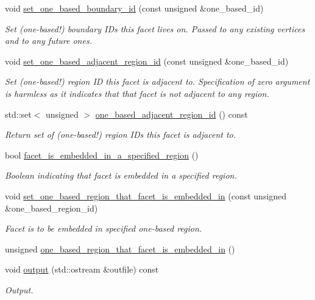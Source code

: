 \begin{DoxyCompactItemize}
void \hyperlink{classoomph_1_1TetMeshFacet_a578058c44b79c484e14be087f4f0a77f}{set\+\_\+one\+\_\+based\+\_\+boundary\+\_\+id} (const unsigned \&one\+\_\+based\+\_\+id)
\begin{DoxyCompactList}\small\item\em Set (one-\/based!) boundary I\+Ds this facet lives on. Passed to any existing vertices and to any future ones. \end{DoxyCompactList}\item 
void \hyperlink{classoomph_1_1TetMeshFacet_ac9be074ef764a6b59cbef9840fe7f38b}{set\+\_\+one\+\_\+based\+\_\+adjacent\+\_\+region\+\_\+id} (const unsigned \&one\+\_\+based\+\_\+id)
\begin{DoxyCompactList}\small\item\em Set (one-\/based!) region ID this facet is adjacent to. Specification of zero argument is harmless as it indicates that that facet is not adjacent to any region. \end{DoxyCompactList}\item 
std\+::set$<$ unsigned $>$ \hyperlink{classoomph_1_1TetMeshFacet_acd88930abc1356702d60841b0e8224e9}{one\+\_\+based\+\_\+adjacent\+\_\+region\+\_\+id} () const
\begin{DoxyCompactList}\small\item\em Return set of (one-\/based!) region I\+Ds this facet is adjacent to. \end{DoxyCompactList}\item 
bool \hyperlink{classoomph_1_1TetMeshFacet_a511eb9fd9ae134075c0736486fd8b69d}{facet\+\_\+is\+\_\+embedded\+\_\+in\+\_\+a\+\_\+specified\+\_\+region} ()
\begin{DoxyCompactList}\small\item\em Boolean indicating that facet is embedded in a specified region. \end{DoxyCompactList}\item 
void \hyperlink{classoomph_1_1TetMeshFacet_a3b81b5e50eae3d6494d43c8e74318b93}{set\+\_\+one\+\_\+based\+\_\+region\+\_\+that\+\_\+facet\+\_\+is\+\_\+embedded\+\_\+in} (const unsigned \&one\+\_\+based\+\_\+region\+\_\+id)
\begin{DoxyCompactList}\small\item\em Facet is to be embedded in specified one-\/based region. \end{DoxyCompactList}\item 
unsigned \hyperlink{classoomph_1_1TetMeshFacet_acbceefd4c9afbd31c0a163e7a008e6e4}{one\+\_\+based\+\_\+region\+\_\+that\+\_\+facet\+\_\+is\+\_\+embedded\+\_\+in} ()
\item 
void \hyperlink{classoomph_1_1TetMeshFacet_a10fc468ac2700b4fdd96168a5b17eca3}{output} (std\+::ostream \&outfile) const
\begin{DoxyCompactList}\small\item\em Output. \end{DoxyCompactList}\end{DoxyCompactItemize}
